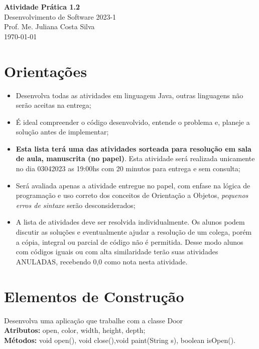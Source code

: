 \documentclass[12pt,a4paper, brazil]{article}
\begin{document}
\begin{center}
{\textbf {\huge Atividade Prática 1.2}}\\[5mm]
{\large Desenvolvimento de Software 2023-1} \\
{\large Prof. Me. Juliana Costa Silva} \\
\today\\[5mm] %
\end{center}

\section*{Orientações}

\begin{itemize}
  \item Desenvolva todas as atividades em linguagem Java, outras linguagens não serão aceitas na entrega;
  \item É ideal compreender o código desenvolvido, entende o problema e, planeje a solução antes de implementar;
  \item \textbf{Esta lista terá uma das atividades sorteada para resolução em sala de aula, manuscrita (no papel)}. Esta atividade será realizada unicamente no dia 03\/04\/2023 as 19:00hs com 20 minutos para entrega e sem consulta;
  \item Será avaliada apenas a atividade entregue no papel, com enfase na lógica de programação e uso correto dos conceitos de Orientação a Objetos, \textit{pequenos erros de sintaxe} serão desconsiderados;
  \item A lista de atividades deve ser resolvida individualmente. Os alunos podem discutir as soluções e eventualmente ajudar a resolução de um colega, porém a cópia, integral ou parcial de código não é permitida. Desse modo alunos com códigos iguais ou com alta similaridade terão suas atividades ANULADAS, recebendo 0,0 como nota nesta atividade.
\end{itemize}


\vspace{0.5cm}


\section{Elementos de Construção}
\par
Desenvolva uma aplicação que trabalhe com a classe Door \\
\textbf{Atributos:} open, color, width, height, depth;\\
\textbf{Métodos:} void open(), void close(),void paint(String s), boolean isOpen().\\
\end{document}
